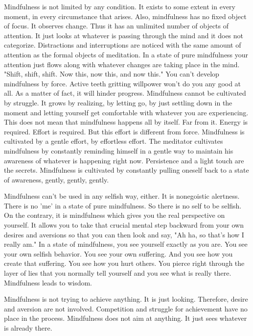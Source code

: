 Mindfulness is not limited by any condition. It exists to some extent in every
moment, in every circumstance that arises. Also, mindfulness has no fixed object
of focus. It observes change. Thus it has an unlimited number of objects of
attention. It just looks at whatever is passing through the mind and it does not
categorize. Distractions and interruptions are noticed with the same amount of
attention as the formal objects of meditation. In a state of pure mindfulness
your attention just flows along with whatever changes are taking place in the
mind. "Shift, shift, shift. Now this, now this, and now this." You can't develop
mindfulness by force. Active teeth gritting willpower won't do you any good at
all. As a matter of fact, it will hinder progress. Mindfulness cannot be
cultivated by struggle. It grows by realizing, by letting go, by just settling
down in the moment and letting yourself get comfortable with whatever you are
experiencing. This does not mean that mindfulness happens all by itself. Far
from it. Energy is required. Effort is required. But this effort is different
from force. Mindfulness is cultivated by a gentle effort, by effortless effort.
The meditator cultivates mindfulness by constantly reminding himself in a gentle
way to maintain his awareness of whatever is happening right now. Persistence
and a light touch are the secrets. Mindfulness is cultivated by constantly
pulling oneself back to a state of awareness, gently, gently, gently.

Mindfulness can't be used in any selfish way, either. It is nonegoistic
alertness. There is no 'me' in a state of pure mindfulness. So there is no self
to be selfish. On the contrary, it is mindfulness which gives you the real
perspective on yourself. It allows you to take that crucial mental step backward
from your own desires and aversions so that you can then look and say, "Ah ha,
so that's how I really am." In a state of mindfulness, you see yourself exactly
as you are. You see your own selfish behavior. You see your own suffering. And
you see how you create that suffering. You see how you hurt others. You pierce
right through the layer of lies that you normally tell yourself and you see what
is really there. Mindfulness leads to wisdom.

Mindfulness is not trying to achieve anything. It is just looking. Therefore,
desire and aversion are not involved. Competition and struggle for achievement
have no place in the process. Mindfulness does not aim at anything. It just sees
whatever is already there.


